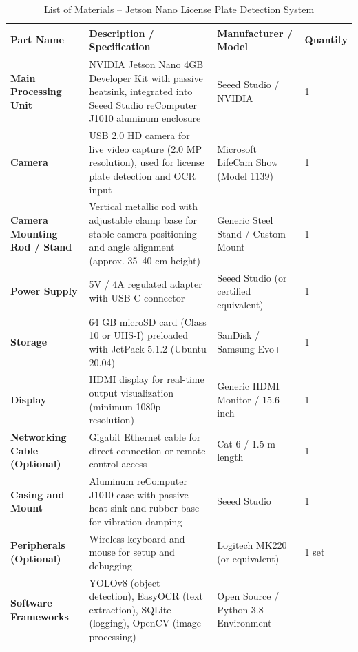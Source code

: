 \begin{table}[h!]
	\centering
	\caption{List of Materials  – Jetson Nano License Plate Detection System}
	\label{tab:listofparts}
	\renewcommand{\arraystretch}{1.3}
	\begin{tabular}{|p{3.1cm}|p{6.3cm}|p{3.1cm}|p{1.8cm}|}
		\hline
		\textbf{Part Name} & \textbf{Description / Specification} & \textbf{Manufacturer / Model} & \textbf{Quantity} \\
		\hline
		\textbf{Main Processing Unit} & NVIDIA Jetson Nano 4GB Developer Kit with passive heatsink, integrated into Seeed Studio reComputer J1010 aluminum enclosure & Seeed Studio / NVIDIA & 1 \\
		\hline
		\textbf{Camera} & USB 2.0 HD camera for live video capture (2.0 MP resolution), used for license plate detection and OCR input & Microsoft LifeCam Show (Model 1139) & 1 \\
		\hline
		\textbf{Camera Mounting Rod / Stand} & Vertical metallic rod with adjustable clamp base for stable camera positioning and angle alignment (approx. 35–40 cm height) & Generic Steel Stand / Custom Mount & 1 \\
		\hline
		\textbf{Power Supply} & 5V / 4A regulated adapter with USB-C connector & Seeed Studio (or certified equivalent) & 1 \\
		\hline
		\textbf{Storage} & 64 GB microSD card (Class 10 or UHS-I) preloaded with JetPack 5.1.2 (Ubuntu 20.04) & SanDisk / Samsung Evo+ & 1 \\
		\hline
		\textbf{Display} & HDMI display for real-time output visualization (minimum 1080p resolution) & Generic HDMI Monitor / 15.6-inch & 1 \\
		\hline
		\textbf{Networking Cable (Optional)} & Gigabit Ethernet cable for direct connection or remote control access & Cat 6 / 1.5 m length & 1 \\
		\hline
		\textbf{Casing and Mount} & Aluminum reComputer J1010 case with passive heat sink and rubber base for vibration damping & Seeed Studio & 1 \\
		\hline
		\textbf{Peripherals (Optional)} & Wireless keyboard and mouse for setup and debugging & Logitech MK220 (or equivalent) & 1 set \\
		\hline
		\textbf{Software Frameworks} & YOLOv8 (object detection), EasyOCR (text extraction), SQLite (logging), OpenCV (image processing) & Open Source / Python 3.8 Environment & -- \\
		\hline
	\end{tabular}
\end{table}

